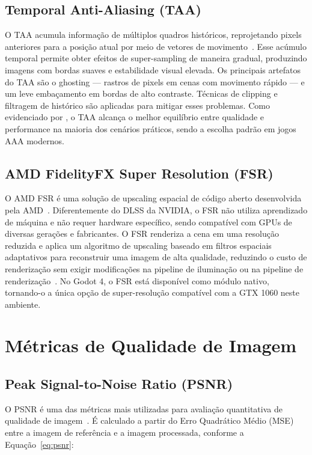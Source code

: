 \documentclass[twoside,english,brazilian]{UNISINOSmonografia}
\begin{document}
\subsection{Temporal Anti-Aliasing (TAA)}

O TAA acumula informação de múltiplos quadros históricos, reprojetando pixels anteriores para a posição atual por meio de vetores de movimento~\cite{yang2020dlss}. Esse acúmulo temporal permite obter efeitos de super-sampling de maneira gradual, produzindo imagens com bordas suaves e estabilidade visual elevada. Os principais artefatos do TAA são o ghosting — rastros de pixels em cenas com movimento rápido — e um leve embaçamento em bordas de alto contraste. Técnicas de clipping e filtragem de histórico são aplicadas para mitigar esses problemas. Como evidenciado por , o TAA alcança o melhor equilíbrio entre qualidade e performance na maioria dos cenários práticos, sendo a escolha padrão em jogos AAA modernos.

\subsection{AMD FidelityFX Super Resolution (FSR)}

O AMD FSR é uma solução de upscaling espacial de código aberto desenvolvida pela AMD~\cite{amd_fsr}. Diferentemente do DLSS da NVIDIA, o FSR não utiliza aprendizado de máquina e não requer hardware específico, sendo compatível com GPUs de diversas gerações e fabricantes. O FSR renderiza a cena em uma resolução reduzida e aplica um algoritmo de upscaling baseado em filtros espaciais adaptativos para reconstruir uma imagem de alta qualidade, reduzindo o custo de renderização sem exigir modificações na pipeline de iluminação ou na pipeline de renderização~\cite{amd_fsr}. No Godot 4, o FSR está disponível como módulo nativo, tornando-o a única opção de super-resolução compatível com a GTX 1060 neste ambiente.

\section{Métricas de Qualidade de Imagem}

\subsection{Peak Signal-to-Noise Ratio (PSNR)}

O PSNR é uma das métricas mais utilizadas para avaliação quantitativa de qualidade de imagem~\cite{hore2010psnr}. É calculado a partir do Erro Quadrático Médio (MSE) entre a imagem de referência e a imagem processada, conforme a Equação~\ref{eq:psnr}:
\end{document}
